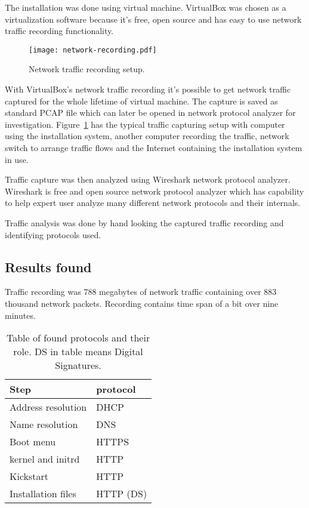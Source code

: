 The installation was done using virtual machine. VirtualBox was chosen
as a virtualization software because it's free, open source and has
easy to use network traffic recording functionality.

\begin{figure}[h]
  \texttt{[image: network-recording.pdf]}
  \caption{Network traffic recording setup.\label{fig:network-recording}}
\end{figure}

With VirtualBox's network traffic recording it's possible to get
network traffic captured for the whole lifetime of virtual
machine. The capture is saved as standard PCAP file which can later be
opened in network protocol analyzer for
investigation. Figure~\ref{fig:network-recording} has the typical
traffic capturing setup with computer using the installation
system, another computer recording the traffic, network switch
to arrange traffic flows and the Internet containing the installation
system in use.

Traffic capture was then analyzed using Wireshark network protocol
analyzer. Wireshark is free and open source network protocol analyzer
which has capability to help expert user analyze many different
network protocols and their internals.

Traffic analysis was done by hand looking the captured traffic
recording and identifying protocols used.

\subsection{Results found}

Traffic recording was 788 megabytes of network traffic containing over
883 thousand network packets. Recording contains time span of a bit
over nine minutes.

\begin{table}[!ht]
  \def\arraystretch{1.1}%
  \begin{center}
    \begin{tabular}{| l | l |}
      \hline
      Step               & protocol    \\
      \hline
      Address resolution & DHCP        \\
      Name resolution    & DNS         \\
      Boot menu          & HTTPS       \\
      kernel and initrd  & HTTP        \\
      Kickstart          & HTTP        \\
      Installation files & HTTP (DS)   \\
      \hline
    \end{tabular}
    \caption{Table of found protocols and their role. DS in table
      means Digital Signatures.\label{tab:found_protocols_table}}
  \end{center}
\end{table}


